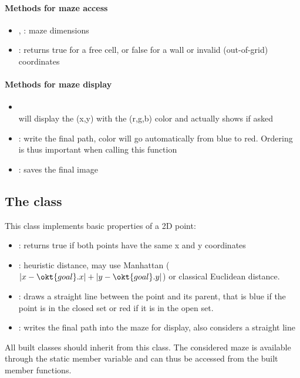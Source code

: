 \documentclass{ecnreport}
\begin{document}
\paragraph{Methods for maze access}
\begin{itemize}
 \item {}, : maze dimensions
 \item {}: returns true for a free cell, or false for a wall or invalid (out-of-grid) coordinates
\end{itemize}

\paragraph{Methods for maze display}
\begin{itemize}
 \item {}\\
    will display the (x,y) with the (r,g,b) color and actually shows if asked
 \item {}: write the final path, color will go automatically from blue to red.
 Ordering is thus important when calling this function
 \item {}: saves the final image
\end{itemize}

\subsection{The  class}\label{ptClass}

This class implements basic properties of a 2D point:

\begin{itemize}
 \item {}: returns true if both points have the same x and y coordinates
 \item {}: heuristic distance, may use Manhattan
 ($|x-\okt{goal}.x| + |y-\okt{goal}.y|$) or classical Euclidean distance.
 \item {}: draws a straight line between the point and its parent, that
 is blue if the point is in the closed set or red if it is in the open set.
 \item {}: writes the final path into the maze for display, also considers a straight line
\end{itemize}
All built classes should inherit from this class. The considered maze is available through the static member variable  and can thus
be accessed from the built member functions.
\end{document}
